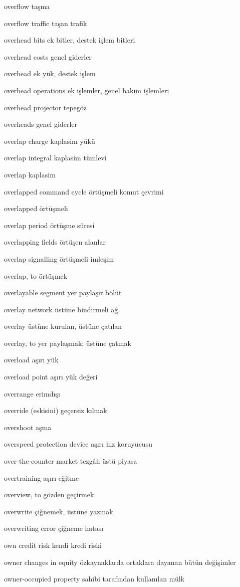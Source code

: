 \documentclass[12pt,fleqn]{article}\usepackage{../../common}
\begin{document}
overflow taşma

overflow traffic taşan trafik

overhead bits ek bitler, destek işlem bitleri

overhead costs genel giderler

overhead ek yük, destek işlem

overhead operations ek işlemler, genel bakım işlemleri

overhead projector tepegöz

overheads genel giderler

overlap charge kaplasim yükü

overlap integral kaplasim tümlevi

overlap kaplasim

overlapped command cycle örtüşmeli komut çevrimi

overlapped örtüşmeli

overlap period örtüşme süresi

overlapping fields örtüşen alanlar

overlap signalling örtüşmeli imleşim

overlap, to örtüşmek

overlayable segment yer paylaşır bölüt

overlay network üstüne bindirmeli ağ

overlay üstüne kurulan, üstüne çatılan

overlay, to yer paylaşmak; üstüne çatmak

overload aşırı yük

overload point aşırı yük değeri

overrange erimdışı

override (eskisini) geçersiz kılmak

overshoot aşma

overspeed protection device aşırı hız koruyucusu

over-the-counter market tezgâh üstü piyasa

overtraining aşırı eğitme

overview, to gözden geçirmek

overwrite çiğnemek, üstüne yazmak

overwriting error çiğneme hatası

own credit risk kendi kredi riski

owner changes in equity özkaynaklarda ortaklara dayanan bütün değişimler

owner-occupied property sahibi tarafından kullanılan mülk
\end{document}
